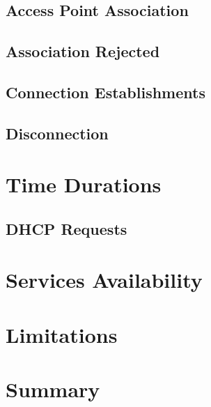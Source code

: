 \subsection{Access Point Association}

\subsection{Association Rejected}


\subsection{Connection Establishments}

\subsection{Disconnection}




\section{Time Durations}
\subsection{DHCP Requests}



\section{Services Availability}
















\section{Limitations}




\section{Summary}

